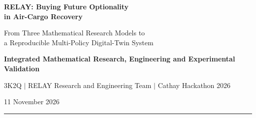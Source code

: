 \documentclass[10pt,a4paper]{article}
\theoremstyle{plain}
\theoremstyle{definition}
\theoremstyle{remark}
\begin{document}

\begin{center}

{\LARGE\bfseries\color{Navy}
RELAY: Buying Future Optionality\\[3pt]
in Air-Cargo Recovery}

\vspace{7pt}

{\large
From Three Mathematical Research Models to\\
a Reproducible Multi-Policy Digital-Twin System}

\vspace{9pt}

{\normalsize
\textbf{Integrated Mathematical Research,
Engineering and Experimental Validation}
}

\vspace{5pt}

{\small
3K2Q
\quad $|$ \quad
RELAY Research and Engineering Team
\quad $|$ \quad
Cathay Hackathon 2026
}

\vspace{4pt}

{\small
11 November 2026
}

\vspace{7pt}

{\color{RuleGray}\rule{0.82\linewidth}{0.6pt}}

\end{center}
\end{document}
